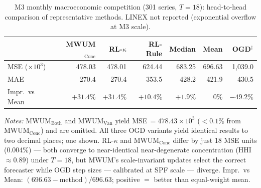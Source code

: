 \documentclass[a4paper,12pt]{article}
\begin{document}
\begin{table}[htbp]
\centering
\caption{M3 monthly macroeconomic competition (301 series, $T{=}18$):
  head-to-head comparison of representative methods. LINEX not reported
  (exponential overflow at M3 scale).}
\label{tab:m3}
\setlength{\tabcolsep}{7pt}\renewcommand{\arraystretch}{1.2}\small
\begin{tabular}{l r r r r r r}
\toprule
& MWUM$_\text{Conc}$ & RL-$\kappa$ & RL-Rule & Median & \textbf{Mean} & OGD$^\dagger$ \\
\midrule
MSE (${\times}10^3$) & 478.03 & 478.01 & 624.44 & 683.25 & 696.63 & 1{,}039.0 \\
MAE                  & 270.4  & 270.4  & 353.5  & 428.2  & 421.9  & 430.5 \\
Impr.\ vs Mean       & $+31.4\%$ & $+31.4\%$ & $+10.4\%$ & $+1.9\%$ & 0\% & $-49.2\%$ \\
\bottomrule
\end{tabular}
\par\vspace{4pt}
\begin{minipage}{\linewidth}\scriptsize
\textit{Notes:} MWUM$_\text{Both}$ and MWUM$_\text{Van}$ yield MSE\,$=478.43{\times}10^3$
  ($<0.1\%$ from MWUM$_\text{Conc}$) and are omitted. All three OGD variants yield
  identical results to two decimal places; one shown. RL-$\kappa$ and MWUM$_\text{Conc}$
  differ by just 18 MSE units (0.004\%) --- both converge to near-identical near-degenerate
  concentration (HHI\,$\approx 0.89$) under $T{=}18$, but MWUM's scale-invariant updates
  select the correct forecaster while OGD step sizes --- calibrated at SPF scale --- diverge.
  Impr.\ vs Mean: $(696.63 - \text{method})/696.63$; positive $=$ better than equal-weight mean.
\end{minipage}
\end{table}
\end{document}
